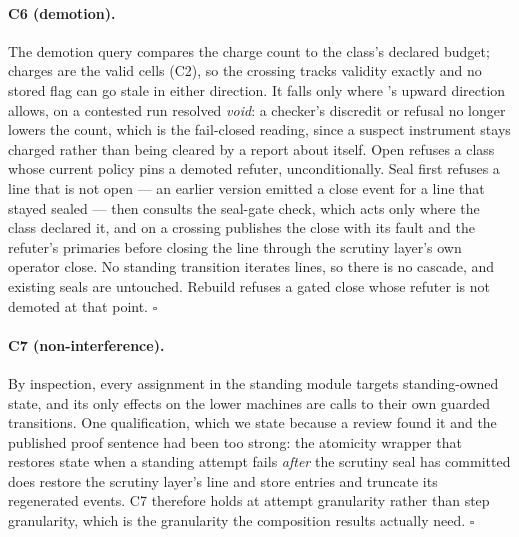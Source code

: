 \documentclass[11pt,a4paper]{article}
\theoremstyle{plain}
\theoremstyle{definition}
\theoremstyle{remark}
\begin{document}
\paragraph{C6 (demotion).} The demotion query compares the charge count to the class's declared budget; charges are the valid cells (C2), so the crossing tracks validity exactly and no stored flag can go stale in either direction. It falls only where 's upward direction allows, on a contested run resolved \emph{void}: a checker's discredit or refusal no longer lowers the count, which is the fail-closed reading, since a suspect instrument stays charged rather than being cleared by a report about itself. Open refuses a class whose current policy pins a demoted refuter, unconditionally. Seal first refuses a line that is not open --- an earlier version emitted a close event for a line that stayed sealed --- then consults the seal-gate check, which acts only where the class declared it, and on a crossing publishes the close with its fault and the refuter's primaries before closing the line through the scrutiny layer's own operator close. No standing transition iterates lines, so there is no cascade, and existing seals are untouched. Rebuild refuses a gated close whose refuter is not demoted at that point. $\square$

\paragraph{C7 (non-interference).} By inspection, every assignment in the standing module targets standing-owned state, and its only effects on the lower machines are calls to their own guarded transitions. One qualification, which we state because a review found it and the published proof sentence had been too strong: the atomicity wrapper that restores state when a standing attempt fails \emph{after} the scrutiny seal has committed does restore the scrutiny layer's line and store entries and truncate its regenerated events. C7 therefore holds at attempt granularity rather than step granularity, which is the granularity the composition results actually need. $\square$



\end{document}
